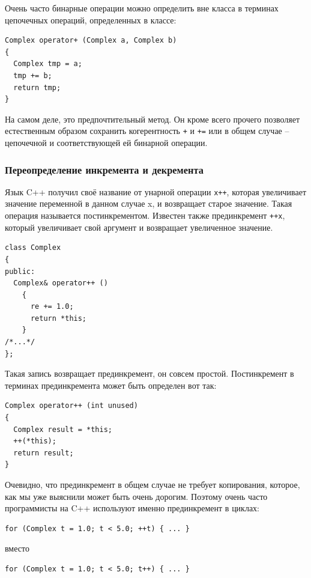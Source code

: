 \documentclass[a4paper,12pt,oneside]{article}
\begin{document}
Очень часто бинарные операции можно определить вне класса в терминах цепочечных операций, определенных в классе:

\begin{lstlisting}
Complex operator+ (Complex a, Complex b)
{
  Complex tmp = a;
  tmp += b;
  return tmp;
}
\end{lstlisting}

На самом деле, это предпочтительный метод. Он кроме всего прочего позволяет естественным образом сохранить когерентность \lstinline!+! и \lstinline!+=! или в общем случае -- цепочечной и соответствующей ей бинарной операции.

\subsubsection{Переопределение инкремента и декремента}\label{IncrOverload}

Язык C++ получил своё название от унарной операции \lstinline!x++!, которая увеличивает значение переменной в данном случае x, и возвращает старое значение. Такая операция называется постинкрементом. Известен также прединкремент \lstinline!++x!, который увеличивает свой аргумент и возвращает увеличенное значение.

\begin{lstlisting}
class Complex
{
public:
  Complex& operator++ ()
    {
      re += 1.0;
      return *this;      
    }
/*...*/
};
\end{lstlisting}

Такая запись возвращает прединкремент, он совсем простой. Постинкремент в терминах прединкремента может быть определен вот так:

\begin{lstlisting}
Complex operator++ (int unused)
{
  Complex result = *this;
  ++(*this);
  return result;
} 
\end{lstlisting}

Очевидно, что прединкремент в общем случае не требует копирования, которое, как мы уже выяснили может быть очень дорогим. Поэтому очень часто программисты на C++ используют именно прединкремент в циклах:

\begin{lstlisting}
for (Complex t = 1.0; t < 5.0; ++t) { ... }
\end{lstlisting}

вместо

\begin{lstlisting}
for (Complex t = 1.0; t < 5.0; t++) { ... }
\end{lstlisting}
\end{document}
